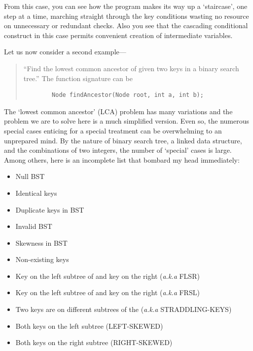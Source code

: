 From this case, you can see how the program makes its way up a `staircase', one step at a time,
marching straight through the key conditions wasting no resource on unnecessary or redundant checks.
Also you see that the cascading conditional construct in this case permits
convenient creation of intermediate variables.


Let us now consider a second example---
\begin{quote}
    ``Find the lowest common ancestor of given two keys in a binary search tree.''
    The function signature can be
    \begin{lstlisting}
        Node findAncestor(Node root, int a, int b);
    \end{lstlisting}
\end{quote}

The `lowest common ancestor' (LCA) problem has many variations and the problem we are to solve
here is a much simplified version.
Even so, the numerous special cases enticing for a special treatment can be
overwhelming to an unprepared mind.
By the nature of binary search tree, a linked data structure, and the combinations of two integers,
the number of `special' cases is large.
Among others, here is an incomplete list that bombard my head immediately:
\begin{itemize}
    \item Null BST
    \item Identical keys
    \item Duplicate keys in BST
    \item Invalid BST
    \item Skewness in BST
    \item Non-existing keys
    \item Key  on the left subtree of  and key  on the right
    (\textit{a.k.a} FLSR)
    \item Key  on the left subtree of  and key  on the right
    (\textit{a.k.a} FRSL)
    \item Two keys are on different subtrees of the  (\textit{a.k.a} STRADDLING-KEYS)
    \item Both keys on the left subtree (LEFT-SKEWED)
    \item Both keys on the right subtree (RIGHT-SKEWED)
\end{itemize}

